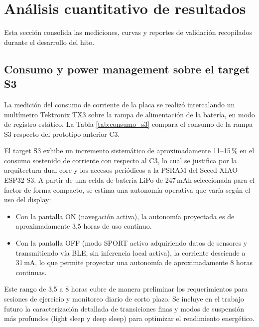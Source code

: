 \documentclass[letterpaper,11pt]{article}
\newcommand{\rtabla}[1]{Tabla \ref{#1}}
\begin{document}
\newpage

\section{Análisis cuantitativo de resultados}

Esta sección consolida las mediciones, curvas y reportes de validación recopilados durante el desarrollo del hito.

\subsection{Consumo y power management sobre el target S3}

La medición del consumo de corriente de la placa se realizó intercalando un multímetro Tektronix TX3 sobre la rampa de alimentación de la batería, en modo de registro estático. La \rtabla{tab:consumo_s3} compara el consumo de la rampa S3 respecto del prototipo anterior C3.

\begin{table}[H]
\centering
\caption{Comparación de consumo de corriente en batería (estado activo).}
\label{tab:consumo_s3}
\end{table}

El target S3 exhibe un incremento sistemático de aproximadamente 11--15\,\% en el consumo sostenido de corriente con respecto al C3, lo cual se justifica por la arquitectura dual-core y los accesos periódicos a la PSRAM del Seeed XIAO ESP32-S3. A partir de una celda de batería LiPo de 247\,mAh seleccionada para el factor de forma compacto, se estima una autonomía operativa que varía según el uso del display:
\begin{itemize}
    \item Con la pantalla ON (navegación activa), la autonomía proyectada es de aproximadamente 3,5 horas de uso continuo.
    \item Con la pantalla OFF (modo SPORT activo adquiriendo datos de sensores y transmitiendo vía BLE, sin inferencia local activa), la corriente desciende a 31\,mA, lo que permite proyectar una autonomía de aproximadamente 8 horas continuas.
\end{itemize}
Este rango de 3,5 a 8 horas cubre de manera preliminar los requerimientos para sesiones de ejercicio y monitoreo diario de corto plazo. Se incluye en el trabajo futuro la caracterización detallada de transiciones finas y modos de suspensión más profundos (light sleep y deep sleep) para optimizar el rendimiento energético.
\end{document}
